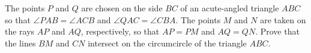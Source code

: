 The points $P$ and $Q$ are chosen on the side $BC$ of an acute-angled triangle $ABC$ so that $\angle PAB = \angle ACB$ and $\angle QAC = \angle CBA$. The points $M$ and $N$ are taken on the rays $AP$ and $AQ$, respectively, so that $AP = PM$ and $AQ = QN$. Prove that the lines $BM$ and $CN$ intersect on the circumcircle of the triangle $ABC$.
